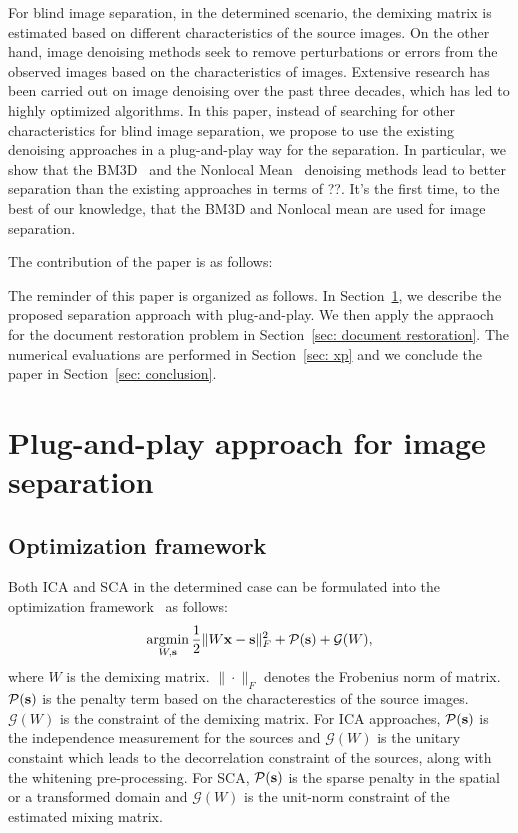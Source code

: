 \documentclass[conference]{IEEEtran}
\newcommand{\argmin}{\mathop{\mathrm{argmin}}}
\theoremstyle{plain}
\begin{document}
For blind image separation, in the determined scenario, the demixing matrix is estimated based on different characteristics of the source images. On the other hand, image denoising methods seek to remove perturbations or errors from the observed images based on the characteristics of images. Extensive research has been carried out on image denoising over the past three decades, which has led to highly optimized algorithms. In this paper, instead of searching for other characteristics for blind image separation, we propose to use the existing denoising approaches in a plug-and-play way for the separation. In particular, we show that the BM3D~\cite{dabov2007image} and the Nonlocal Mean~\cite{buades2005non} denoising methods lead to better separation than the existing approaches in terms of ??. It's the first time, to the best of our knowledge, that the BM3D and Nonlocal mean are used for image separation.

The contribution of the paper is as follows:

The reminder of this paper is organized as follows. In Section~\ref{sec: plug and play}, we describe the proposed separation approach with plug-and-play. We then apply the appraoch for the document restoration problem in Section~\ref{sec: document restoration}. The numerical evaluations are performed in Section~\ref{sec: xp} and we conclude the paper in Section~\ref{sec: conclusion}.  


\section{Plug-and-play approach for image separation}
\label{sec: plug and play}

\subsection{Optimization framework}
Both ICA and SCA in the determined case can be formulated into the optimization framework~\cite{feng2018revisiting} as follows:
\begin{equation}
\label{eq: optimization framework}
\argmin_{W, \bs} \frac{1}{2} \|W\bx - \bs\|_F^2 + \mathcal{P}(\bs) + \mathcal{G}(W),
\end{equation}
where $W$ is the demixing matrix. $\|\cdot\|_F$ denotes the Frobenius norm of matrix. $\mathcal{P}({\mathbf s})$ is the penalty term based on the characterestics of the source images. $\mathcal{G}(W)$ is the constraint of the demixing matrix. For ICA approaches, $\mathcal{P}({\mathbf s})$ is the independence measurement for the sources and $\mathcal{G}(W)$ is the unitary constaint which leads to the decorrelation constraint of the sources, along with the whitening pre-processing. For SCA, $\mathcal{P}({\mathbf s})$ is the sparse penalty in the spatial or a transformed domain and $\mathcal{G}(W)$ is the unit-norm constraint of the estimated mixing matrix.
\end{document}
